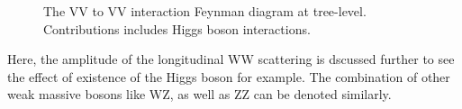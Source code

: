 \begin{figure}[tbp]
\begin{center}
\caption{
The VV to VV interaction Feynman diagram at tree-level. Contributions includes Higgs boson interactions.
}
\label{fig:VBSHiggs}
\end{center}
\end{figure}


Here, the amplitude of the longitudinal WW scattering is dscussed further to see the effect of existence of the Higgs boson for example. The combination of other weak massive bosons like WZ, as well as ZZ can be denoted similarly. 

